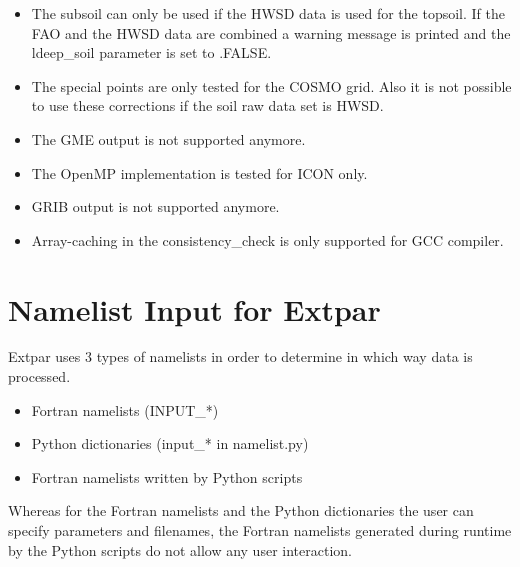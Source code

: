 \documentclass[a4paper,10pt,DIV14,BCOR1cm,titlepage,twoside]{scrartcl}
\begin{document}
\begin{itemize}
\item The subsoil can only be used if the HWSD data is used for the topsoil. If the FAO and the HWSD data are combined a warning message is printed and the ldeep\_soil parameter is set to .FALSE.
\item The special points are only tested for the COSMO grid. Also it is not possible to use these corrections if the soil raw data set is HWSD.
\item The GME output is not supported anymore.
\item The OpenMP implementation is tested for ICON only.
\item GRIB output is not supported anymore.  
\item Array-caching in the consistency\_check is only supported for GCC compiler.
\end{itemize}

\clearpage

\section{Namelist Input for Extpar} \label{namelist_input_for_extpar}
Extpar uses 3 types of namelists in order to determine in which way data is processed.

\begin{itemize}
  \item Fortran namelists (INPUT\_*)
  \item Python dictionaries (input\_* in namelist.py)
  \item Fortran namelists written by Python scripts 
\end{itemize}
Whereas for the Fortran namelists and the Python dictionaries the user can specify parameters and filenames, the Fortran namelists generated during runtime by the
Python scripts do not allow any user interaction.
\end{document}

